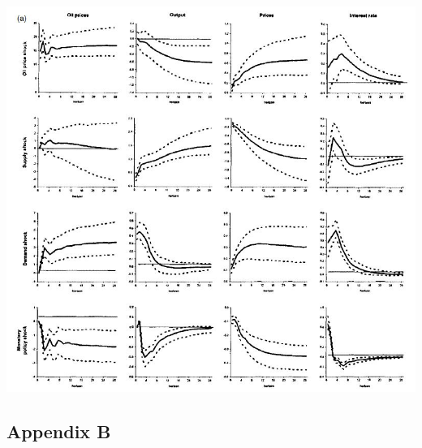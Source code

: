 \documentclass[11pt,preprint, authoryear]{elsarticle}
\let\origfigure\figure
\let\endorigfigure\endfigure
\renewenvironment{figure}[1][2] {
    \expandafter\origfigure\expandafter[H]
} {
    \endorigfigure
}
\numberwithin{equation}{section}
\numberwithin{figure}{section}
\numberwithin{table}{section}
\begin{document}
\begin{figure}
\centering
\includegraphics{Capture.jpg}
\caption{Peersman orignial results}
\end{figure}

\hypertarget{appendix-b}{%
\subsection*{Appendix B}\label{appendix-b}}


\end{document}
